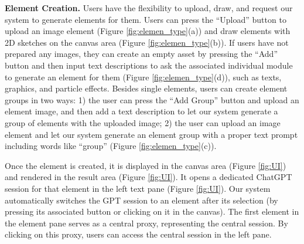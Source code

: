 \textbf{Element Creation.}
{Users have the flexibility to upload, draw, and request our system to generate elements for them.
Users can press the ``Upload'' button to upload an image element (Figure \ref{fig:elemen_type}(a)) and draw elements with 2D sketches on the canvas area (Figure \ref{fig:elemen_type}(b)). If users have not prepared any images, they can create an empty asset by pressing the ``Add'' button and then input text descriptions to ask the {associated} individual module to generate an element for them (Figure \ref{fig:elemen_type}(d)), such as texts, graphics, and particle effects. Besides single elements, users can create element groups in two ways: 1) the user can press the ``Add Group'' button and upload an element image, and then add a text description to let our system generate a group of elements {with the uploaded image}; 2) %
the user can upload an image element and let our system generate an element group with a proper text prompt including words like ``group'' (Figure \ref{fig:elemen_type}(c)).
}




Once the element is created, it is displayed in the canvas area (Figure \ref{fig:UI}) and rendered in the result area (Figure \ref{fig:UI}). It opens a dedicated ChatGPT session for that element in the left text pane (Figure \ref{fig:UI}). {Our system automatically switches the GPT session to an element after its selection (by pressing its associated button or clicking on it in the canvas)}. %
The first element in the element pane serves as a central proxy, representing the central session. By clicking on this proxy, users can access the central session in the left pane.

